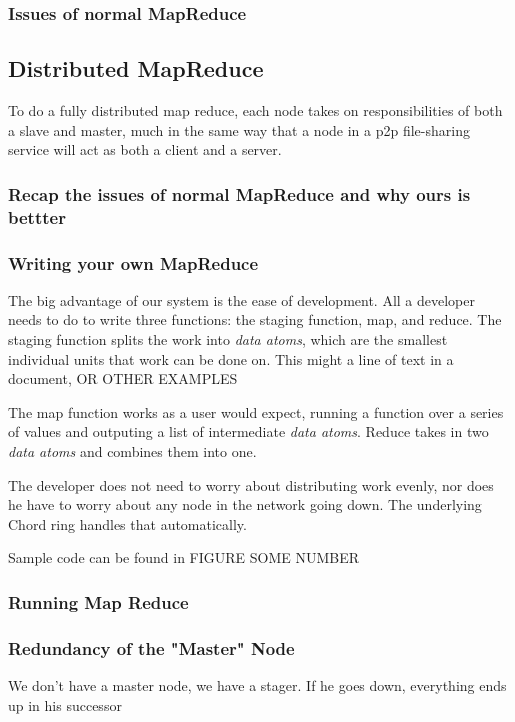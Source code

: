 \documentclass[conference, compsocconf, letterpaper]{IEEEtran}
\begin{document}
\subsubsection{Issues of normal MapReduce } 




\subsection{Distributed MapReduce}
To do a fully distributed map reduce, each node takes on responsibilities of both a slave and master, much in the same way that a node in a p2p file-sharing service will act as both a client and a server.   
\subsubsection{Recap the issues  of normal MapReduce  and why ours is bettter} 


\subsubsection{Writing your own MapReduce}
The big advantage of our system is the ease of development.  All a developer needs to do to write three functions: the staging function, map, and reduce.  The staging function splits the work into \emph{data atoms}, which are the smallest individual units that work can be done on.  This might a line of text in a document, OR OTHER EXAMPLES

The map function works as a user would expect, running a function over a series of values and outputing a list of intermediate \emph{data atoms}.  Reduce takes in two \emph{data atoms} and combines them into one.

The developer does not need to worry about distributing work evenly, nor does he have to worry about any node in the network going down.  The underlying Chord ring handles that automatically.


Sample code can be found in FIGURE SOME NUMBER



\subsubsection{Running Map Reduce}
\subsubsection{Redundancy of the "Master" Node}
We don't have a master node, we have a stager.  If he goes down, everything ends up in his successor
\end{document}
